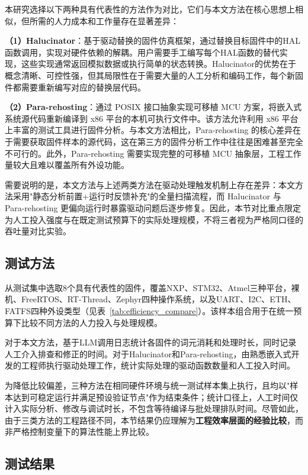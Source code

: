 本研究选择以下两种具有代表性的方法作为对比，它们与本文方法在核心思想上相似，但所需的人力成本和工作量存在显著差异：

\textbf{（1）Halucinator}：基于驱动替换的固件仿真框架，通过替换目标固件中的HAL函数调用，实现对硬件依赖的解耦。用户需要手工编写每个HAL函数的替代实现，这些实现通常返回模拟数据或执行简单的状态转换。Halucinator的优势在于概念清晰、可控性强，但其局限性在于需要大量的人工分析和编码工作，每个新固件都需要重新编写对应的替换层代码。

\textbf{（2）Para-rehosting}：通过 POSIX 接口抽象实现可移植 MCU 方案，将嵌入式系统源代码重新编译到 x86 平台的本机可执行文件中。该方法允许利用 x86 平台上丰富的测试工具进行固件分析。与本文方法相比，Para-rehosting 的核心差异在于需要获取固件样本的源代码，这在第三方的固件分析工作中往往是困难甚至完全不可行的。此外，Para-rehosting 需要实现完整的可移植 MCU 抽象层，工程工作量较大且难以覆盖所有外设功能。

需要说明的是，本文方法与上述两类方法在驱动处理触发机制上存在差异：本文方法采用"静态分析前置+运行时反馈补充"的全量扫描流程，而 Halucinator 与 Para-rehosting 更偏向运行时暴露驱动问题后逐步修复。因此，本节对比重点限定为人工投入强度与在既定测试预算下的实际处理规模，不将三者视为严格同口径的吞吐量对比实验。

\subsection{测试方法}

从测试集中选取8个具有代表性的固件，覆盖NXP、STM32、Atmel三种平台，裸机、FreeRTOS、RT-Thread、Zephyr四种操作系统，以及UART、I2C、ETH、FATFS四种外设类型（见表~\ref{tab:efficiency_compare}）。该样本组合用于在统一预算下比较不同方法的人力投入与处理规模。

对于本文方法，基于LLM调用日志统计各固件的词元消耗和处理时长，同时记录人工介入排查和修正的时间。对于Halucinator和Para-rehosting，由熟悉嵌入式开发的工程师执行驱动处理工作，统计实际处理的驱动函数数量和人工投入时间。

为降低比较偏差，三种方法在相同硬件环境与统一测试样本集上执行，且均以"样本达到可稳定运行并满足预设验证节点"作为结束条件；统计口径上，人工时间仅计入实际分析、修改与调试时长，不包含等待编译与批处理排队时间。尽管如此，由于三类方法的工程路径不同，本节结果仍应理解为\textbf{工程效率层面的经验比较}，而非严格控制变量下的算法性能上界比较。

\subsection{测试结果}

